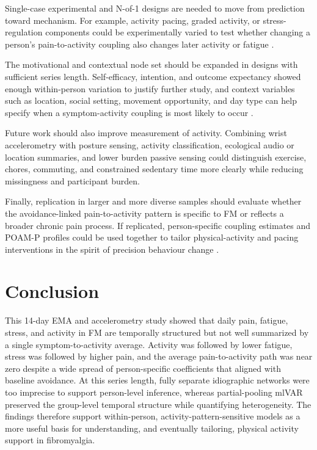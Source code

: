 \documentclass[11pt,a4paper]{article}
\begin{document}
Single-case experimental and N-of-1 designs are needed to move from prediction toward
mechanism. For example, activity pacing, graded activity, or stress-regulation components
could be experimentally varied to test whether changing a person's pain-to-activity coupling
also changes later activity or fatigue \citep{kwasnicka2020nof1,bentley2019realtime}.

The motivational and contextual node set should be expanded in designs with sufficient
series length. Self-efficacy, intention, and outcome expectancy showed enough within-person
variation to justify further study, and context variables such as location, social setting,
movement opportunity, and day type can help specify when a symptom-activity coupling is most
likely to occur \citep{schwarzer2008modeling,maes2022variability}.

Future work should also improve measurement of activity. Combining wrist accelerometry with
posture sensing, activity classification, ecological audio or location summaries, and lower
burden passive sensing could distinguish exercise, chores, commuting, and constrained
sedentary time more clearly while reducing missingness and participant burden.

Finally, replication in larger and more diverse samples should evaluate whether the
avoidance-linked pain-to-activity pattern is specific to FM or reflects a broader chronic
pain process. If replicated, person-specific coupling estimates and POAM-P profiles could be
used together to tailor physical-activity and pacing interventions in the spirit of precision
behaviour change \citep{kwasnicka2020nof1}.

\section{Conclusion}
This 14-day EMA and accelerometry study showed that daily pain, fatigue, stress, and activity
in FM are temporally structured but not well summarized by a single symptom-to-activity
average. Activity was followed by lower fatigue, stress was followed by higher pain, and the
average pain-to-activity path was near zero despite a wide spread of person-specific
coefficients that aligned with baseline avoidance. At this series length, fully separate
idiographic networks were too imprecise to support person-level inference, whereas
partial-pooling mlVAR preserved the group-level temporal structure while quantifying
heterogeneity. The findings therefore support within-person, activity-pattern-sensitive
models as a more useful basis for understanding, and eventually tailoring, physical activity
support in fibromyalgia.
\end{document}
